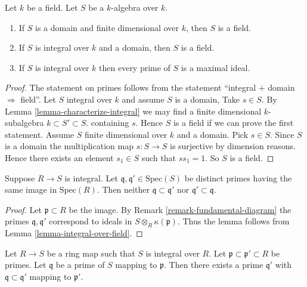 \begin{lemma}
\label{lemma-integral-over-field}
Let $k$ be a field. Let $S$ be a $k$-algebra over $k$.
\begin{enumerate}
\item If $S$ is a domain and finite dimensional over $k$,
then $S$ is a field.
\item If $S$ is integral over $k$ and a domain,
then $S$ is a field.
\item If $S$ is integral over $k$ then every prime of
$S$ is a maximal ideal.
\end{enumerate}
\end{lemma}

\begin{proof}
The statement on primes follows from the statement
``integral $+$ domain $\Rightarrow$ field''.
Let $S$ integral over $k$ and assume $S$ is a domain,
Take $s \in S$. By Lemma
\ref{lemma-characterize-integral} we may find a
finite dimensional $k$-subalgebra $k \subset S' \subset S$.
containing $s$. Hence $S$ is a field if we can prove the
first statement. Assume $S$ finite dimensional
over $k$ and a domain. Pick $s\in S$.
Since $S$ is a domain the multiplication
map $s : S \to S$ is surjective by dimension
reasons. Hence there exists an element $s_1 \in S$
such that $ss_1 = 1$. So $S$ is a field.
\end{proof}

\begin{lemma}
\label{lemma-integral-no-inclusion}
Suppose $R \to S$ is integral.
Let $\mathfrak q, \mathfrak q' \in \text{Spec}(S)$
be distinct primes
having the same image in $\text{Spec}(R)$.
Then neither $\mathfrak q \subset \mathfrak q'$
nor $\mathfrak q' \subset \mathfrak q$.
\end{lemma}

\begin{proof}
Let $\mathfrak p \subset R$ be the image.
By Remark \ref{remark-fundamental-diagram}
the primes $\mathfrak q, \mathfrak q'$
correspond to ideals in
$S \otimes_R \kappa(\mathfrak p)$.
Thus the lemma follows from Lemma \ref{lemma-integral-over-field}.
\end{proof}

\begin{lemma}
\label{lemma-integral-going-up}
Let $R \to S$ be a ring map such that
$S$ is integral over $R$.
Let $\mathfrak p \subset \mathfrak p' \subset R$
be primes. Let $\mathfrak q$ be a prime of $S$ mapping
to $\mathfrak p$. Then there exists a prime $\mathfrak q'$
with $\mathfrak q \subset \mathfrak q'$
mapping to $\mathfrak p'$.
\end{lemma}

